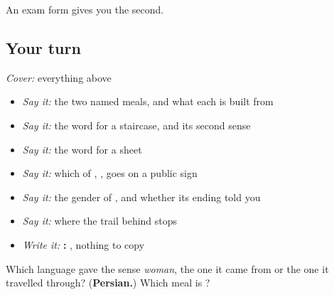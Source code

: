 An exam form gives you the second.

\subsection*{Your turn}
\emph{Cover:} everything above

\begin{itemize}
\raggedright
  \item \emph{Say it:} the two named meals, and what each is built from
  \item \emph{Say it:} the word for a staircase, and its second sense
  \item \emph{Say it:} the word for a sheet
  \item \emph{Say it:} which of \textbf{}, \textbf{}, \textbf{} goes on a public sign
  \item \emph{Say it:} the gender of \textbf{}, and whether its ending told you
  \item \emph{Say it:} where the trail behind \textbf{} stops
  \item \emph{Write it:} \textbf{: }, nothing to copy
\end{itemize}

\begin{tcolorbox}[breakable,colback=teal!4,colframe=teal!35!black,title={Before you move on}]
Which language gave \textbf{} the sense \emph{woman}, the one it came from or the one it travelled through? (\textbf{Persian.}) Which meal is \textbf{  }?
\end{tcolorbox}
